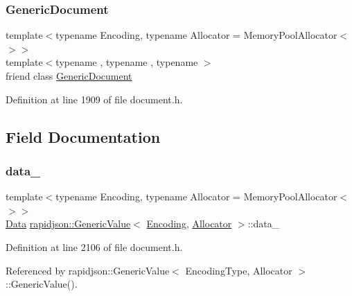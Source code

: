 \subsubsection{\texorpdfstring{GenericDocument}{GenericDocument}}
{\footnotesize\ttfamily template$<$typename Encoding, typename Allocator = Memory\+Pool\+Allocator$<$$>$$>$ \\
template$<$typename , typename , typename $>$ \\
friend class \mbox{\hyperlink{classrapidjson_1_1_generic_document}{Generic\+Document}}\hspace{0.3cm}{\ttfamily [friend]}}



Definition at line 1909 of file document.\+h.



\subsection{Field Documentation}
\mbox{\label{classrapidjson_1_1_generic_value_a7d1d50ccd6639e29231b3f67d94c9ecf}} 
\subsubsection{\texorpdfstring{data\_}{data\_}}
{\footnotesize\ttfamily template$<$typename Encoding, typename Allocator = Memory\+Pool\+Allocator$<$$>$$>$ \\
\mbox{\hyperlink{unionrapidjson_1_1_generic_value_1_1_data}{Data}} \mbox{\hyperlink{classrapidjson_1_1_generic_value}{rapidjson\+::\+Generic\+Value}}$<$ \mbox{\hyperlink{classrapidjson_1_1_encoding}{Encoding}}, \mbox{\hyperlink{classrapidjson_1_1_allocator}{Allocator}} $>$\+::data\+\_\+}



Definition at line 2106 of file document.\+h.



Referenced by rapidjson\+::\+Generic\+Value$<$ Encoding\+Type, Allocator $>$\+::\+Generic\+Value().

\mbox{\label{classrapidjson_1_1_generic_value_ab22b5f5f153376de937e70d6be6dcadc}} 
